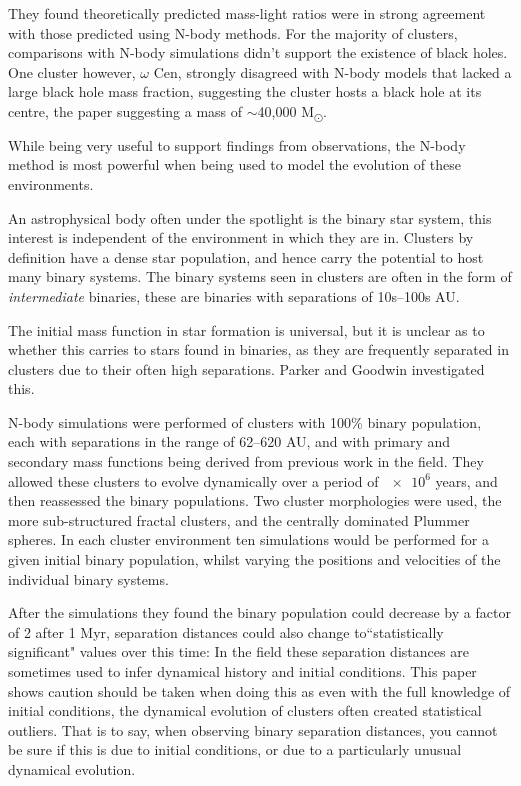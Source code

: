 \documentclass[a4paper,10pt]{article}
\begin{document}
They found theoretically predicted mass-light ratios were in strong agreement with those predicted using N-body methods. For the majority of clusters, comparisons with N-body simulations didn't support the existence of black holes. One cluster however, $\omega$ Cen, strongly disagreed with N-body models that lacked a large black hole mass fraction, suggesting the cluster hosts a black hole at its centre, the paper suggesting a mass of $\sim$40,000 M\textsubscript{\(\odot\)}.

While being very useful to support findings from observations, the N-body method is most powerful when being used to model the evolution of these environments. 

An astrophysical body often under the spotlight is the binary star system, this interest is independent of the environment in which they are in. Clusters by definition have a dense star population, and hence carry the potential to host many binary systems. The binary systems seen in clusters are often in the form of \textit{intermediate} binaries, these are binaries with separations of 10s--100s AU. 

The initial mass function in star formation is universal, but it is unclear as to whether this carries to stars found in binaries, as they are frequently separated in clusters due to their often high separations. Parker and Goodwin investigated this\cite{Binaries}.

N-body simulations were performed of clusters with 100\% binary population, each with separations in the range of 62--620 AU, and with primary and secondary mass functions being derived from previous work in the field. They allowed these clusters to evolve dynamically over a period of $\num{e6}$ years, and then reassessed the binary populations. Two cluster morphologies were used, the more sub-structured fractal clusters, and the centrally dominated Plummer spheres. In each cluster environment ten simulations would be performed for a given initial binary population, whilst varying the positions and velocities of the individual binary systems. 

After the simulations they found the binary population could decrease by a factor of 2 after 1 Myr, separation distances could also change to``statistically significant" values over this time: In the field these separation distances are sometimes used to infer dynamical history and initial conditions. This paper shows caution should be taken when doing this as even with the full knowledge of initial conditions, the dynamical evolution of clusters often created statistical outliers. That is to say, when observing binary separation distances, you cannot be sure if this is due to initial conditions, or due to a particularly unusual dynamical evolution.
\end{document}
